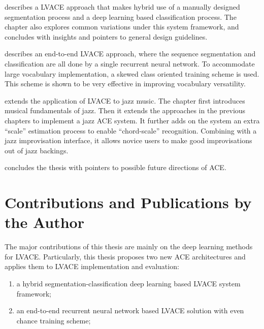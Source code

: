  describes a LVACE approach that makes hybrid use of a manually designed segmentation process and a deep learning based classification process. The chapter also explores common variations under this system framework, and concludes with insights and pointers to general design guidelines.

 describes an end-to-end LVACE approach, where the sequence segmentation and classification are all done by a single recurrent neural network. To accommodate large vocabulary implementation, a skewed class oriented training scheme is used. This scheme is shown to be very effective in improving vocabulary versatility.

 extends the application of LVACE to jazz music. The chapter first introduces musical fundamentals of jazz. Then it extends the approaches in the previous chapters to implement a jazz ACE system. It further adds on the system an extra ``scale'' estimation process to enable ``chord-scale'' recognition. Combining with a jazz improvisation interface, it allows novice users to make good improvisations out of jazz backings.

 concludes the thesis with pointers to possible future directions of ACE.


\section{Contributions and Publications by the Author} \label{sec:1-contribution}
The major contributions of this thesis are mainly on the deep learning methods for LVACE. Particularly, this thesis proposes two new ACE architectures and applies them to LVACE implementation and evaluation:
\begin{enumerate}
\item a hybrid segmentation-classification deep learning based LVACE system framework;
\item an end-to-end recurrent neural network based LVACE solution with even chance training scheme;
\end{enumerate}


